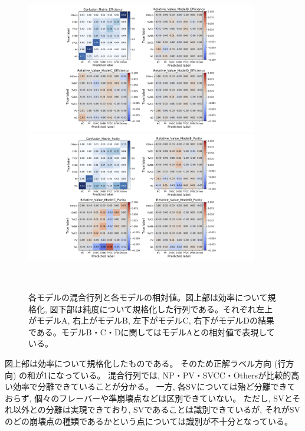 \begin{figure}[htbp]
 \centering
  \begin{minipage}{1.0\textwidth}
   \centering
    \includegraphics[trim = 300 0 300 0, width=0.9\textwidth, clip]{Figure/3Networks/3-3-3-2ConfusionMatrix_1.png}
   \end{minipage}
   
   \begin{minipage}{1.0\textwidth}
   \centering
    \includegraphics[trim = 300 0 300 0, width=0.9\textwidth, clip]{Figure/3Networks/3-3-3-2ConfusionMatrix_2.png}
   \end{minipage}
  \caption[各モデルの混合行列と各モデルの相対値]{各モデルの混合行列と各モデルの相対値。図上部は効率について規格化, 図下部は純度について規格化した行列である。それぞれ左上がモデルA, 右上がモデルB, 左下がモデルC, 右下がモデルDの結果である。モデルB・C・Dに関してはモデルAとの相対値で表現している。}
  \label{3-3-3-2ConfusionMatrix}
\end{figure}

図上部は効率について規格化したものである。
そのため正解ラベル方向 (行方向) の和が1になっている。
混合行列では, NP・PV・SVCC・Othersが比較的高い効率で分離できていることが分かる。
一方, 各SVについては殆ど分離できておらず, 個々のフレーバーや準崩壊点などは区別できていない。
ただし, SVとそれ以外との分離は実現できており, SVであることは識別できているが, それがSVのどの崩壊点の種類であるかという点については識別が不十分となっている。

